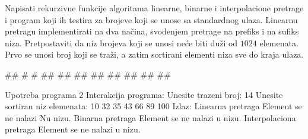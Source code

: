 \begin{Answer}[ref=401]
\end{Answer}

\begin{Exercise}[label=402]
  Napisati rekurzivne funkcije algoritama linearne, binarne i
  interpolacione pretrage i program koji ih testira za brojeve koji se
  unose sa standardnog ulaza. Linearnu pretragu implementirati na dva
  načina, svođenjem pretrage na prefiks i na sufiks
  niza. Pretpostaviti da niz brojeva koji se unosi neće biti duži od
  $1024$ elemenata. Prvo se unosi broj koji se traži, a zatim sortirani
  elementi niza sve do kraja ulaza.

\begin{miditest}
\begin{upotreba}{1}
#\naslovInt#
# #
## 
##
##
##
##
##
##
##
\end{upotreba}
\end{miditest}
\begin{miditest}
\begin{test}{Upotreba programa 2}
Interakcija programa:
  Unesite trazeni broj: 14
  Unesite sortiran niz elemenata:
  10 32 35 43 66 89 100
Izlaz:
  Linearna pretraga
  Element se ne nalazi Nu nizu.
  Binarna pretraga
  Element se ne nalazi u nizu.
  Interpolaciona pretraga
  Element se ne nalazi u nizu.
\end{test}
\end{miditest}


\end{Exercise}

